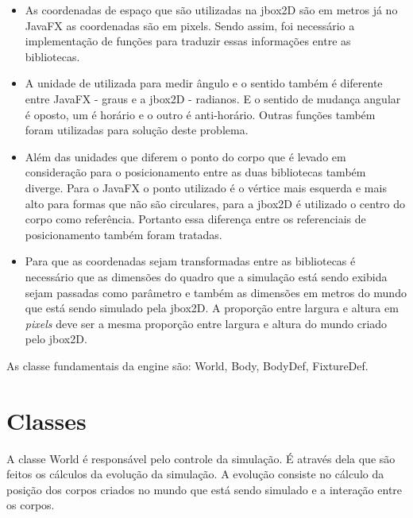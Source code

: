 \begin{itemize}
	\item As coordenadas de espaço que são utilizadas na jbox2D são em metros já no JavaFX as coordenadas são em pixels. Sendo assim, foi necessário a implementação de funções para traduzir essas informações entre as bibliotecas.
	\item A unidade de utilizada para medir ângulo e o sentido também é diferente entre JavaFX - graus e a jbox2D - radianos. E o sentido de mudança angular é oposto, um é horário e o outro é anti-horário. Outras funções também foram utilizadas para solução deste problema.
	\item Além das unidades que diferem o ponto do corpo que é levado em consideração para o posicionamento entre as duas bibliotecas também diverge. Para o JavaFX o ponto utilizado é o vértice mais esquerda e mais alto para formas que não são circulares, para a jbox2D é utilizado o centro do corpo como referência. Portanto essa diferença entre os referenciais de posicionamento também foram tratadas.
	\item Para que as coordenadas sejam transformadas entre as bibliotecas é necessário que as dimensões do quadro que a simulação está sendo exibida sejam passadas como parâmetro e também as dimensões em metros do mundo que está sendo simulado pela jbox2D. A proporção entre largura e altura em \textit{pixels} deve ser a mesma proporção entre largura e altura do mundo criado pelo jbox2D.
\end{itemize}


As classe fundamentais da engine são: World, Body, BodyDef, FixtureDef.

\section{Classes}

A classe World é responsável pelo controle da simulação. É através dela que são feitos os cálculos da evolução da simulação. A evolução consiste no cálculo da posição dos corpos criados no mundo que está sendo simulado e a interação entre os corpos.
